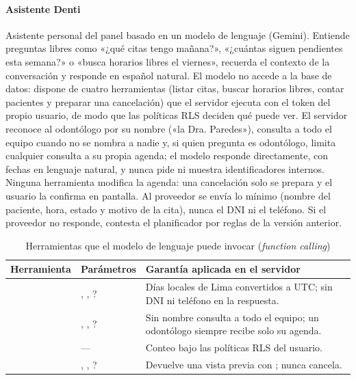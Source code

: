 \documentclass[11pt]{article}
\begin{document}
\paragraph{Asistente Denti} Asistente personal del panel basado en un modelo de lenguaje (Gemini). Entiende preguntas libres como «¿qué citas tengo mañana?», «¿cuántas siguen pendientes esta semana?» o «busca horarios libres el viernes», recuerda el contexto de la conversación y responde en español natural. El modelo no accede a la base de datos: dispone de cuatro herramientas (listar citas, buscar horarios libres, contar pacientes y preparar una cancelación) que el servidor ejecuta con el token del propio usuario, de modo que las políticas RLS deciden qué puede ver. El servidor reconoce al odontólogo por su nombre («la Dra. Paredes»), consulta a todo el equipo cuando no se nombra a nadie y, si quien pregunta es odontólogo, limita cualquier consulta a su propia agenda; el modelo responde directamente, con fechas en lenguaje natural, y nunca pide ni muestra identificadores internos. Ninguna herramienta modifica la agenda: una cancelación solo se prepara y el usuario la confirma en pantalla. Al proveedor se envía lo mínimo (nombre del paciente, hora, estado y motivo de la cita), nunca el DNI ni el teléfono. Si el proveedor no responde, contesta el planificador por reglas de la versión anterior.

\begin{table}[H]
\centering\small
\caption{Herramientas que el modelo de lenguaje puede invocar (\textit{function calling})}\label{tab:denti-tools}
\begin{tabularx}{\linewidth}{@{}P{3.6cm}P{3.6cm}L@{}}
\toprule
\textbf{Herramienta} & \textbf{Parámetros} & \textbf{Garantía aplicada en el servidor} \\
\midrule
{} & , , ? & Días locales de Lima convertidos a UTC; sin DNI ni teléfono en la respuesta. \\
 & , , ? & Sin nombre consulta a todo el equipo; un odontólogo siempre recibe solo su agenda. \\
 & — & Conteo bajo las políticas RLS del usuario. \\
 & , , ? & Devuelve una vista previa con ; nunca cancela. \\
\bottomrule
\end{tabularx}
\end{table}
\end{document}
